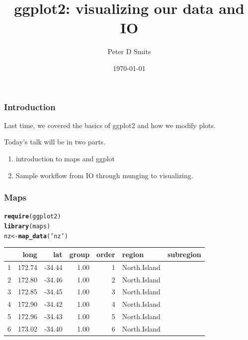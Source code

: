 \documentclass{beamer}\usepackage{graphicx, color}
\title{ggplot2: visualizing our data and IO}
\author{Peter D Smits}
\institute{Committee on Evolutionary Biology \\
University of Chicago}
\date{\today}
\makeatletter
\newcommand{\hlfunctioncall}[1]{\textcolor[rgb]{0.501960784313725,0,0.329411764705882}{\textbf{#1}}}%
\newcommand{\hlstring}[1]{\textcolor[rgb]{0.6,0.6,1}{#1}}%
\newenvironment{kframe}{%
 \def\at@end@of@kframe{}%
 \ifinner\ifhmode%
  \def\at@end@of@kframe{\end{minipage}}%
  \begin{minipage}{\columnwidth}%
 \fi\fi%
 \def\FrameCommand##1{\hskip\@totalleftmargin \hskip-\fboxsep
 \colorbox{shadecolor}{##1}\hskip-\fboxsep
     \hskip-\linewidth \hskip-\@totalleftmargin \hskip\columnwidth}%
 \MakeFramed {\advance\hsize-\width
   \@totalleftmargin\z@ \linewidth\hsize
   \@setminipage}}%
 {\par\unskip\endMakeFramed%
 \at@end@of@kframe}
\newenvironment{knitrout}{}{} %
\makeatother
\begin{document}
\begin{frame}
  \maketitle
\end{frame}

\begin{frame}
  \frametitle{Introduction}

  Last time, we covered the basics of ggplot2 and how we modify plots.

  Today's talk will be in two parts. 
  \begin{enumerate}
    \item introduction to maps and ggplot
    \item Sample workflow from IO through munging to visualizing.
  \end{enumerate}

\end{frame}

\begin{frame}[fragile]
  \frametitle{Maps}
\begin{knitrout}\scriptsize
{}\color{fgcolor}\begin{kframe}
\begin{alltt}
\hlfunctioncall{require}(ggplot2)
\hlfunctioncall{library}(maps)
nz <- \hlfunctioncall{map_data}(\hlstring{'nz'})
\end{alltt}
\end{kframe}
\end{knitrout}


\begin{table}[ht]
\begin{center}
\begin{tabular}{rrrrrll}
  \hline
 & long & lat & group & order & region & subregion \\ 
  \hline
1 & 172.74 & -34.44 & 1.00 &   1 & North.Island  &  \\ 
  2 & 172.80 & -34.46 & 1.00 &   2 & North.Island  &  \\ 
  3 & 172.85 & -34.45 & 1.00 &   3 & North.Island  &  \\ 
  4 & 172.90 & -34.42 & 1.00 &   4 & North.Island  &  \\ 
  5 & 172.96 & -34.43 & 1.00 &   5 & North.Island  &  \\ 
  6 & 173.02 & -34.40 & 1.00 &   6 & North.Island  &  \\ 
   \hline
\end{tabular}
\end{center}
\end{table}



\end{frame}
\end{document}
